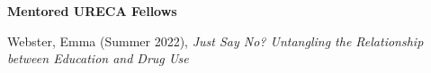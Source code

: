 \begin{comment}
{\large\textbf{Undergraduate Honors Thesis Committee Member}}
\begin{etaremune}
\item Qian, Tom (Apr 2016), \textit{Appraisal Structure Universality}. Vanderbilt%
%
\item Sparks, Sloane (Apr 2014), \textit{Gender Differences in Emotional Intelligence: Positive Emotions \& Appraisal Theory}. Vanderbilt%
\item Fuller, Lydia (Apr 2014), \textit{GED Student Achievement Trajectories and Predictors: Using the Latent Class Growth Model to Understand Heterogeneous Learning Patterns}. Vanderbilt%
\end{etaremune}
\end{comment}
\pagebreak
{\large\textbf{Mentored URECA Fellows}}
\begin{etaremune}%
\item Webster, Emma (Summer 2022), \textit{Just Say No? Untangling the Relationship between Education and Drug Use}%
\end{etaremune}%
